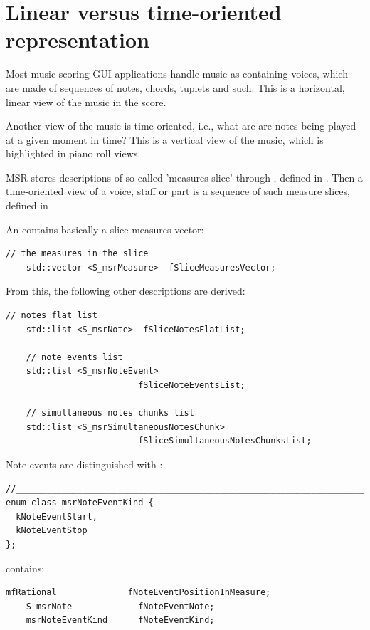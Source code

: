 \section{Linear versus time-oriented representation}\label{Linear versus time-oriented representation}

Most music scoring GUI applications handle music as containing voices, which are made of sequences of notes, chords, tuplets and such. This is a horizontal, linear view of the music in the score.

Another view of the music is time-oriented, i.e., what are are notes being played at a given moment in time? This is a vertical view of the music, which is highlighted in piano roll views.

MSR stores descriptions of so-called 'measures slice' through , defined in . Then a time-oriented view of a voice, staff or part is a sequence of such measure slices, defined in .%

An  contains basically a slice measures vector:
\begin{lstlisting}[language=CPlusPlus]
    // the measures in the slice
    std::vector <S_msrMeasure>  fSliceMeasuresVector;
\end{lstlisting}

From this, the following other descriptions are derived:
\begin{lstlisting}[language=CPlusPlus]
    // notes flat list
    std::list <S_msrNote>  fSliceNotesFlatList;

    // note events list
    std::list <S_msrNoteEvent>
                          fSliceNoteEventsList;

    // simultaneous notes chunks list
    std::list <S_msrSimultaneousNotesChunk>
                          fSliceSimultaneousNotesChunksList;
\end{lstlisting}

Note events are distinguished with :
\begin{lstlisting}[language=CPlusPlus]
//________________________________________________________________________
enum class msrNoteEventKind {
  kNoteEventStart,
  kNoteEventStop
};
\end{lstlisting}

 contains:
\begin{lstlisting}[language=CPlusPlus]
    mfRational              fNoteEventPositionInMeasure;
    S_msrNote             fNoteEventNote;
    msrNoteEventKind      fNoteEventKind;

\end{lstlisting}

